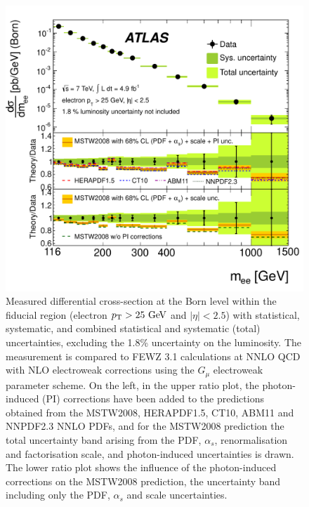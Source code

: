 \begin{figure}[p]
    \centering
    \includegraphics[height=0.3\textheight]{figures/ss-inclboson-drellyan-atlas7tev}
    \caption{Measured differential cross-section at the Born level within the
    fiducial region (electron $\pt > 25 \GeV$ and $|\eta| < 2.5$) with statistical,
     systematic, and combined statistical and systematic (total) uncertainties,
     excluding the 1.8\% uncertainty on the luminosity. The measurement is compared
     to FEWZ 3.1 calculations at NNLO QCD with NLO electroweak corrections
     using the $G_{\mu}$ electroweak parameter scheme.
      On the left, in the upper ratio plot, the photon-induced (PI)
     corrections have been added to the predictions obtained from the MSTW2008,
     HERAPDF1.5, CT10, ABM11 and NNPDF2.3 NNLO PDFs, and for the MSTW2008 prediction
     the total uncertainty band arising from the PDF, $\alpha_s$, renormalisation
     and factorisation scale, and photon-induced uncertainties is drawn. The lower
     ratio plot shows the influence of the photon-induced corrections on the
     MSTW2008 prediction, the uncertainty band including only the PDF, $\alpha_s$
     and scale uncertainties.}
    \label{fig:ss-inclboson-drellyan-atlas7tev}
\end{figure}


